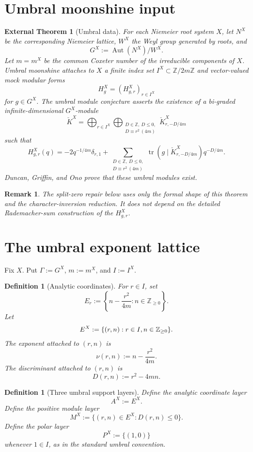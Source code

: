 \documentclass[11pt]{article}
\newtheorem{definition}[theorem]{Definition}
\newtheorem{remark}[theorem]{Remark}
\newtheorem{inputthm}[theorem]{External Theorem}
\newcommand{\ZZ}{\mathbb Z}
\newcommand{\tr}{\operatorname{tr}}
\newcommand{\Aut}{\operatorname{Aut}}
\begin{document}
\section{Umbral moonshine input}

\begin{inputthm}[Umbral data]
For each Niemeier root system \(X\), let \(N^X\) be the corresponding Niemeier lattice, \(W^X\) the Weyl group generated by roots, and
\[
G^X:=\Aut(N^X)/W^X.
\]
Let \(m=m^X\) be the common Coxeter number of the irreducible components of \(X\).  Umbral moonshine attaches to \(X\) a finite index set \(I^X\subset\ZZ/2m\ZZ\) and vector-valued mock modular forms
\[
H_g^X=(H_{g,r}^X)_{r\in I^X}
\]
for \(g\in G^X\).  The umbral module conjecture asserts the existence of a bi-graded infinite-dimensional \(G^X\)-module
\[
\check K^X=\bigoplus_{r\in I^X}\bigoplus_{\substack{D\in\ZZ,\ D\le0,\\D\equiv r^2\ (4m)}}\check K^X_{r,-D/4m}
\]
such that
\[
H^X_{g,r}(q)=-2q^{-1/4m}\delta_{r,1}
+\sum_{\substack{D\in\ZZ,\ D\le0,\\D\equiv r^2\ (4m)}}
\tr(g\mid\check K^X_{r,-D/4m})q^{-D/4m}.
\]
Duncan, Griffin, and Ono prove that these umbral modules exist.
\end{inputthm}

\begin{remark}
The split-zero repair below uses only the formal shape of this theorem and the character-inversion reduction.  It does not depend on the detailed Rademacher-sum construction of the \(H^X_{g,r}\).
\end{remark}

\section{The umbral exponent lattice}

Fix \(X\).  Put \(\Gamma:=G^X\), \(m:=m^X\), and \(I:=I^X\).

\begin{definition}[Analytic coordinates]
For \(r\in I\), set
\[
E_r:=\left\{n-\frac{r^2}{4m}:n\in\ZZ_{\ge0}\right\}.
\]
Let
\[
E^X:=\{(r,n):r\in I,\\ n\in\ZZ_{\ge0}\}.
\]
The exponent attached to \((r,n)\) is
\[
\nu(r,n):=n-\frac{r^2}{4m}.
\]
The discriminant attached to \((r,n)\) is
\[
D(r,n):=r^2-4mn.
\]
\end{definition}

\begin{definition}[Three umbral support layers]
Define the analytic coordinate layer
\[
A^X:=E^X.
\]
Define the positive module layer
\[
M^X:=\{(r,n)\in E^X:D(r,n)\le0\}.
\]
Define the polar layer
\[
P^X:=\{(1,0)\}
\]
whenever \(1\in I\), as in the standard umbral convention.
\end{definition}
\end{document}
